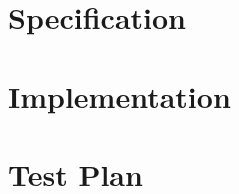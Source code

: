 \documentclass[paper=a4, fontsize=11pt]{report} %
\begin{document}


\chapter{Specification} %
\label{cha:specification}







\chapter{Implementation} %
\label{cha:implementation}





\chapter{Test Plan} %
\label{cha:test_plan}
\end{document}
